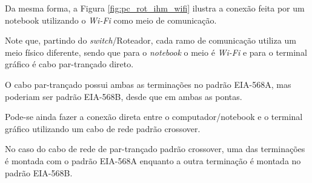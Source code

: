 \begin{figure}[ht!]
	\centering
\end{figure}


Da mesma forma, a Figura \ref{fig:pc_rot_ihm_wifi} ilustra a conexão feita por um notebook utilizando o \textit{Wi-Fi} como meio de comunicação. 

Note que, partindo do \textit{switch}/Roteador, cada ramo de comunicação utiliza um meio físico diferente, sendo que para o \textit{notebook} o meio é \textit{Wi-Fi} e para o terminal gráfico é cabo par-trançado direto.

O cabo par-trançado possui ambas as terminações no padrão EIA-568A, mas poderiam ser padrão EIA-568B, desde que em ambas as pontas.


\begin{figure}[ht!]
	\centering
\end{figure}


Pode-se ainda fazer a conexão direta entre o computador/notebook e o terminal gráfico utilizando um cabo de rede padrão crossover.

No caso do cabo de rede de par-trançado padrão crossover, uma das terminações é montada com o padrão EIA-568A enquanto a outra terminação é montada no padrão EIA-568B.




